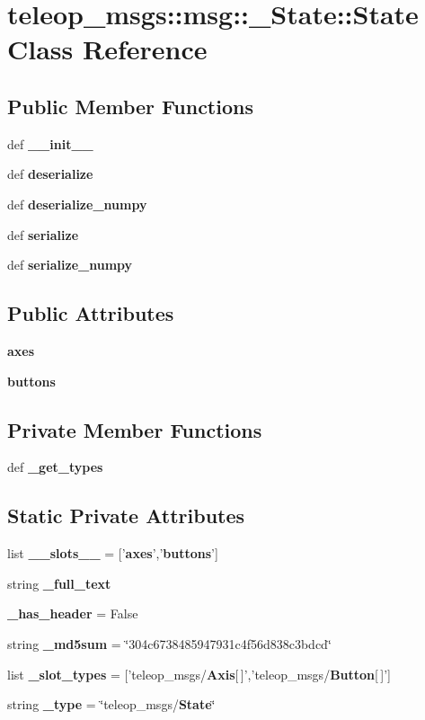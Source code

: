 \section{teleop\_\-msgs::msg::\_\-State::State Class Reference}
\label{classteleop__msgs_1_1msg_1_1__State_1_1State}
\subsection*{Public Member Functions}
\begin{DoxyCompactItemize}
\item 
def {\bf \_\-\_\-init\_\-\_\-}
\item 
def {\bf deserialize}
\item 
def {\bf deserialize\_\-numpy}
\item 
def {\bf serialize}
\item 
def {\bf serialize\_\-numpy}
\end{DoxyCompactItemize}
\subsection*{Public Attributes}
\begin{DoxyCompactItemize}
\item 
{\bf axes}
\item 
{\bf buttons}
\end{DoxyCompactItemize}
\subsection*{Private Member Functions}
\begin{DoxyCompactItemize}
\item 
def {\bf \_\-get\_\-types}
\end{DoxyCompactItemize}
\subsection*{Static Private Attributes}
\begin{DoxyCompactItemize}
\item 
list {\bf \_\-\_\-slots\_\-\_\-} = ['{\bf axes}','{\bf buttons}']
\item 
string {\bf \_\-full\_\-text}
\item 
{\bf \_\-has\_\-header} = False
\item 
string {\bf \_\-md5sum} = \char`\"{}304c6738485947931c4f56d838c3bdcd\char`\"{}
\item 
list {\bf \_\-slot\_\-types} = ['teleop\_\-msgs/{\bf Axis}[$\,$]','teleop\_\-msgs/{\bf Button}[$\,$]']
\item 
string {\bf \_\-type} = \char`\"{}teleop\_\-msgs/{\bf State}\char`\"{}
\end{DoxyCompactItemize}


